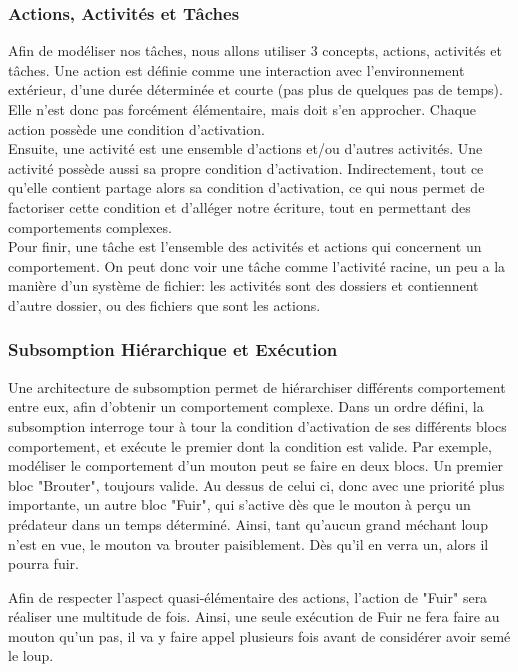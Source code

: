 \documentclass[11pt,a4paper]{article}
\begin{document}
		\subsubsection{Actions, Activités et Tâches}
			Afin de modéliser nos tâches, nous allons utiliser 3 concepts, actions, activités et tâches. Une action est définie comme une interaction avec l'environnement extérieur, d'une durée déterminée et courte (pas plus de quelques pas de temps). Elle n'est donc pas forcément élémentaire, mais doit s'en approcher. Chaque action possède une condition d'activation.\\
			Ensuite, une activité est une ensemble d'actions et/ou d'autres activités. Une activité possède aussi sa propre condition d'activation. Indirectement, tout ce qu'elle contient partage alors sa condition d'activation, ce qui nous permet de factoriser cette condition et d'alléger notre écriture, tout en permettant des comportements complexes.\\
			Pour finir, une tâche est l'ensemble des activités et actions qui concernent un comportement. On peut donc voir une tâche comme l'activité racine, un peu a la manière d'un système de fichier: les activités sont des dossiers et contiennent d'autre dossier, ou des fichiers que sont les actions.
		\subsubsection{Subsomption Hiérarchique et Exécution}
		
			Une architecture de subsomption permet de hiérarchiser différents comportement entre eux, afin d'obtenir un comportement complexe. Dans un ordre défini, la subsomption interroge tour à tour la condition d'activation de ses différents blocs comportement, et exécute le premier dont la condition est valide. Par exemple, modéliser le comportement d'un mouton peut se faire en deux blocs. Un premier bloc "Brouter", toujours valide. Au dessus de celui ci, donc avec une priorité plus importante, un autre bloc "Fuir", qui s'active dès que le mouton à perçu un prédateur dans un temps déterminé. Ainsi, tant qu'aucun grand méchant loup n'est en vue, le mouton va brouter paisiblement. Dès qu'il en verra un, alors il pourra fuir.
			
			Afin de respecter l'aspect quasi-élémentaire des actions, l'action de "Fuir" sera réaliser une multitude de fois. Ainsi, une seule exécution de Fuir ne fera faire au mouton qu'un pas, il va y faire appel plusieurs fois avant de considérer avoir semé le loup.
			
\end{document}
